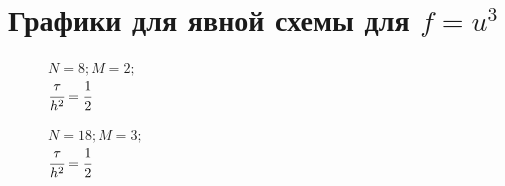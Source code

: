 \documentclass[12pt]{extarticle}
\numberwithin{equation}{section}
\begin{document}
\section{Графики для явной схемы для $f=u^3$} \label{grap2}
\begin{figure}[H]
\begin{minipage}[h]{0.43\linewidth}
 $N=8; M=2;$\\$\cfrac{\tau}{h^2} = \cfrac{1}{2}$ \\
\end{minipage}
\hfill
\begin{minipage}[h]{0.43\linewidth}
 $N=18; M=3;$\\$ \cfrac{\tau}{h^2} = \cfrac{1}{2}$
\end{minipage}


\end{figure}
\end{document}
